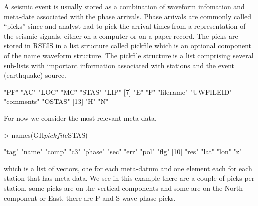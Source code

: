 \documentclass{article}
\begin{document}
A seismic event is usually stored as a combination
of waveform infomation and meta-date associated with
the phase arrivals.  Phase arrivals are
commonly called ``picks'' since and analyst 
had to pick the arrival times from a representation
of the seismic signals, either on a computer or on a paper
record.
The picks are stored in RSEIS 
in a list structure called pickfile
which is an optional  component of the name waveform structure.
The pickfile structure is a list comprising several
sub-lists with important information associated with
stations and the event (earthquake) source.
\begin{Schunk}
\begin{Soutput}
 [1] "PF"       "AC"       "LOC"      "MC"       "STAS"     "LIP"     
 [7] "E"        "F"        "filename" "UWFILEID" "comments" "OSTAS"   
[13] "H"        "N"       
\end{Soutput}
\end{Schunk}
For now we consider the most relevant 
meta-data, 
\begin{Schunk}
\begin{Sinput}
> names(GH$pickfile$STAS)
\end{Sinput}
\begin{Soutput}
 [1] "tag"   "name"  "comp"  "c3"    "phase" "sec"   "err"   "pol"   "flg"  
[10] "res"   "lat"   "lon"   "z"    
\end{Soutput}
\end{Schunk}
which is a list of vectors, 
one for each meta-datum and one element
each for each station that has meta-data.
We see in this example there are a couple of picks per station,
some picks are on the vertical components and some
are on the North component or East, there
are P and S-wave phase picks.
\end{document}

